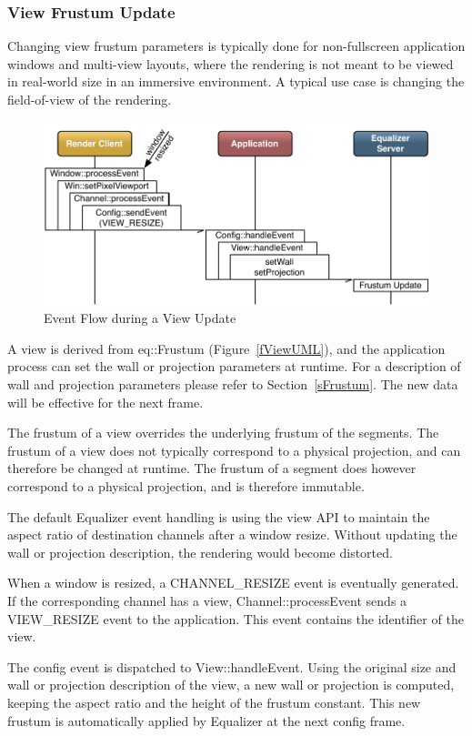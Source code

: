 \documentclass[10pt,a4]{scrartcl}
\newcommand{\fig}[1]{Figure~\ref{#1}}
\newcommand{\sref}[1]{Section~\ref{#1}}
\begin{document}
\subsubsection{View Frustum Update}

Changing view frustum parameters is typically done for non-fullscreen
application windows and multi-view layouts, where the rendering is not
meant to be viewed in real-world size in an immersive environment. A
typical use case is changing the field-of-view of the rendering.

\begin{figure}
  \includegraphics[width=.618\textwidth]{images/viewUpdate.pdf}
  {\caption{\label{fViewUpdate}Event Flow during a View Update}}
\end{figure}
A view is derived from \textsf{eq::Frustum} (\fig{fViewUML}), and the
application process can set the wall or projection parameters at
runtime. For a description of wall and projection parameters please refer
to \sref{sFrustum}. The new data will be effective for the next frame.

The frustum of a view overrides the underlying frustum of the
segments. The frustum of a view does not typically correspond to a
physical projection, and can therefore be changed at runtime. The
frustum of a segment does however correspond to a physical projection,
and is therefore immutable.

The default Equalizer event handling is using the view API to maintain
the aspect ratio of destination channels after a window resize. Without
updating the wall or projection description, the rendering would become
distorted.

When a window is resized, a \textsf{CHANNEL\_RESIZE} event is eventually
generated. If the corresponding channel has a view,
\textsf{Channel::processEvent} sends a \textsf{VIEW\_RESIZE} event to
the application. This event contains the identifier of the view. 

The config event is dispatched to \textsf{View::handleEvent}. Using the original
size and wall or projection description of the view, a new wall or projection is
computed, keeping the aspect ratio and the height of the frustum constant. This
new frustum is automatically applied by Equalizer at the next config frame.
\end{document}
